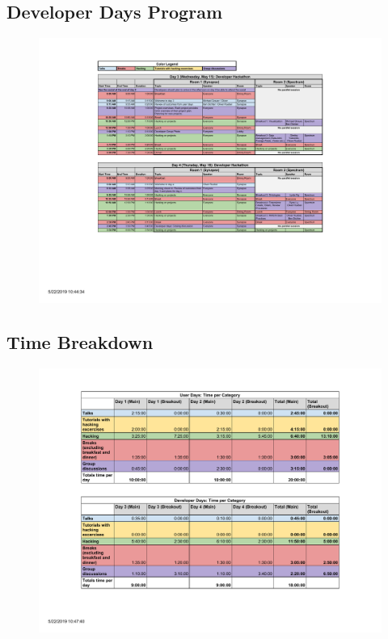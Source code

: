 \documentclass{article}
\begin{document}
\clearpage
\subsection{Developer Days Program}
\label{sec:program:devdays}
\begin{figure}[h!]
\includegraphics[width=\textwidth]{figures/agenda_developer_days.pdf}
\end{figure}

\subsection{Time Breakdown}
\begin{figure}[h!]
\centering
\includegraphics[width=11.5cm]{figures/agenda_time_breakdown.pdf}
\end{figure}
\end{document}
